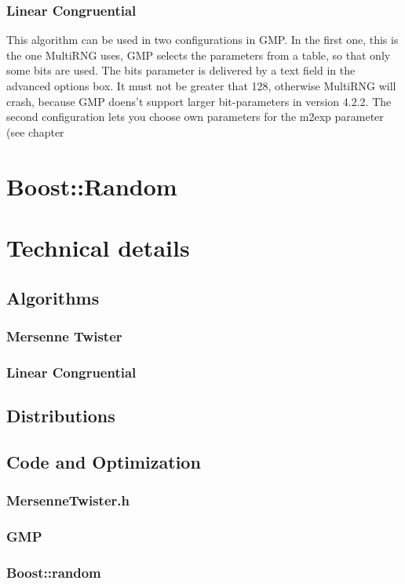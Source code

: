 \documentclass{scrartcl}
\begin{document}
\subsubsection{Linear Congruential}
This algorithm can be used in two configurations in GMP. In the first one, this is the one MultiRNG uses, GMP selects the parameters from a table, so that only some bits are used. The bits parameter is delivered by a text field in the advanced options box. It must not be greater that 128, otherwise MultiRNG will crash, because GMP doens't support larger bit-parameters in version 4.2.2.\newline
The second configuration lets you choose own parameters for the m2exp parameter (see chapter
\section{Boost::Random}
\section{Technical details}
\subsection{Algorithms}
\subsubsection{Mersenne Twister}
\subsubsection{Linear Congruential}
\subsection{Distributions}
\subsection{Code and Optimization}
\subsubsection{MersenneTwister.h}
\subsubsection{GMP}
\subsubsection{Boost::random}
\end{document}

